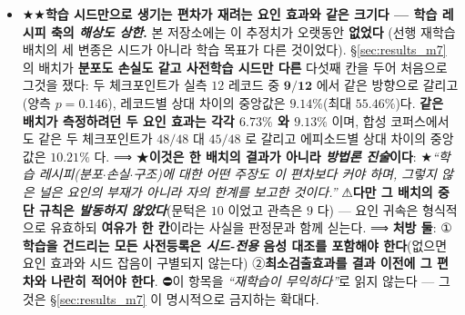\documentclass[11pt]{report}
\numberwithin{equation}{chapter}
\numberwithin{figure}{chapter}
\numberwithin{table}{chapter}
\begin{document}
\begin{itemize}
        지표, 채점 창, 그리고 \S\ref{sec:results_m3} 이 다시 만난 거리 셸 지표가 같은 반이다).
        ⟹ \textbf{처방은 값의 \emph{되읽기}를 게이트로 세우는 것이다} --- 이 결함을 잡은
        것은 산문 추론이 아니라 기준선의 반환 행에서 수심을 되읽은 게이트 하나였다.
  \item ★★\textbf{학습 시드만으로 생기는 편차가 재려는 요인 효과와 같은 크기다 --- 학습
        레시피 축의 \emph{해상도 상한}.} 본 저장소에는 이 추정치가 오랫동안 \textbf{없었다}
        (선행 재학습 배치의 세 변종은 시드가 아니라 학습 목표가 다른 것이었다).
        \S\ref{sec:results_m7} 의 배치가 \textbf{분포도 손실도 같고 사전학습 시드만 다른}
        다섯째 칸을 두어 처음으로 그것을 쟀다: 두 체크포인트가 실측 $12$ 레코드 중
        $\mathbf{9/12}$ 에서 같은 방향으로 갈리고(양측 $p = 0.146$), 레코드별 상대 차이의
        중앙값은 $\mathbf{9.14\%}$(최대 $55.46\%$)다. \textbf{같은 배치가 측정하려던 두 요인
        효과는 각각 $6.73\%$ 와 $9.13\%$} 이며, 합성 코퍼스에서도 같은 두 체크포인트가
        $48/48$ 대 $45/48$ 로 갈리고 에피소드별 상대 차이의 중앙값은 $\mathbf{10.21\%}$ 다.
        ⟹ ★\textbf{이것은 한 배치의 결과가 아니라 \emph{방법론 진술}이다}:
        ★\emph{``학습 레시피(분포$\cdot$손실$\cdot$구조)에 대한 어떤 주장도 이 편차보다
        커야 하며, 그렇지 않은 널은 요인의 부재가 아니라 자의 한계를 보고한 것이다.''}
        ⚠\textbf{다만 그 배치의 중단 규칙은 \emph{발동하지 않았다}}(문턱은 $10$ 이었고
        관측은 $9$ 다) --- 요인 귀속은 형식적으로 유효하되 \textbf{여유가 한 칸}이라는
        사실을 판정문과 함께 싣는다. ⟹ \textbf{처방 둘}: ①\textbf{학습을 건드리는 모든
        사전등록은 \emph{시드-전용} 음성 대조를 포함해야 한다}(없으면 요인 효과와 시드
        잡음이 구별되지 않는다) ②\textbf{최소검출효과를 결과 이전에 그 편차와 나란히
        적어야 한다}. ⛔이 항목을 \emph{``재학습이 무익하다''}로 읽지 않는다 --- 그것은
        \S\ref{sec:results_m7} 이 명시적으로 금지하는 확대다.
\end{itemize}
\end{document}
